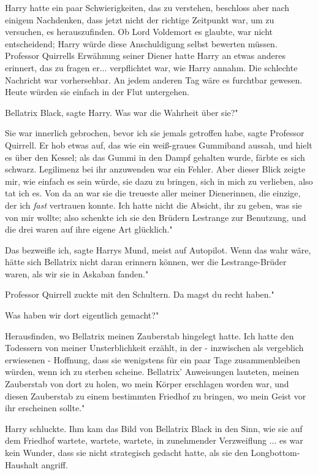 Harry hatte ein paar Schwierigkeiten, das zu verstehen, beschloss aber nach
einigem Nachdenken, dass jetzt nicht der richtige Zeitpunkt war, um zu
versuchen, es herauszufinden. Ob Lord Voldemort es glaubte, war nicht
entscheidend; Harry würde diese Anschuldigung selbst bewerten müssen. Professor
Quirrells Erwähnung seiner Diener hatte Harry an etwas anderes erinnert, das zu
fragen er... verpflichtet war, wie Harry annahm. Die schlechte Nachricht war
vorhersehbar. An jedem anderen Tag wäre es furchtbar gewesen. Heute würden sie
einfach in der Flut untergehen.

\glqq Bellatrix Black\grqq{}, sagte Harry. \glqq Was war die Wahrheit über sie?"

\glqq Sie war innerlich gebrochen, bevor ich sie jemals getroffen habe\grqq{},
sagte Professor Quirrell. Er hob etwas auf, das wie ein weiß-graues Gummiband
aussah, und hielt es über den Kessel; als das Gummi in den Dampf gehalten wurde,
färbte es sich schwarz. \glqq Legilimenz bei ihr anzuwenden war ein Fehler. Aber
dieser Blick zeigte mir, wie einfach es sein würde, sie dazu zu bringen, sich in
mich zu verlieben, also tat ich es. Von da an war sie die treueste aller meiner
Dienerinnen, die einzige, der ich \emph{fast} vertrauen konnte. Ich hatte nicht
die Absicht, ihr zu geben, was sie von mir wollte; also schenkte ich sie den
Brüdern Lestrange zur Benutzung, und die drei waren auf ihre eigene Art
glücklich."

\glqq Das bezweifle ich\grqq{}, sagte Harrys Mund, meist auf Autopilot. \glqq
Wenn das wahr wäre, hätte sich Bellatrix nicht daran erinnern können, wer die
Lestrange-Brüder waren, als wir sie in Askaban fanden."

Professor Quirrell zuckte mit den Schultern. \glqq Da magst du recht haben."

\glqq Was haben wir dort eigentlich gemacht?"

\glqq Herausfinden, wo Bellatrix meinen Zauberstab hingelegt hatte. Ich hatte
den Todessern von meiner Unsterblichkeit erzählt, in der - inzwischen als
vergeblich erwiesenen - Hoffnung, dass sie wenigstens für ein paar Tage
zusammenbleiben würden, wenn ich zu sterben scheine. Bellatrix' Anweisungen
lauteten, meinen Zauberstab von dort zu holen, wo mein Körper erschlagen worden
war, und diesen Zauberstab zu einem bestimmten Friedhof zu bringen, wo mein
Geist vor ihr erscheinen sollte."

Harry schluckte. Ihm kam das Bild von Bellatrix Black in den Sinn, wie sie auf
dem Friedhof wartete, wartete, wartete, in zunehmender Verzweiflung ... es war
kein Wunder, dass sie nicht strategisch gedacht hatte, als sie den
Longbottom-Haushalt angriff.

